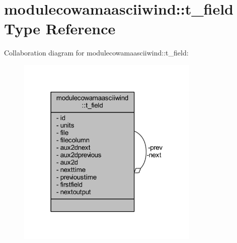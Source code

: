 \hypertarget{structmodulecowamaasciiwind_1_1t__field}{}\section{modulecowamaasciiwind\+:\+:t\+\_\+field Type Reference}
\label{structmodulecowamaasciiwind_1_1t__field}


Collaboration diagram for modulecowamaasciiwind\+:\+:t\+\_\+field\+:\nopagebreak
\begin{figure}[H]
\begin{center}
\leavevmode
\includegraphics[width=246pt]{structmodulecowamaasciiwind_1_1t__field__coll__graph}
\end{center}
\end{figure}
